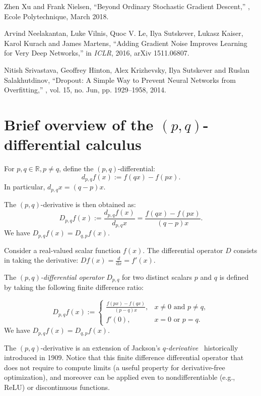 \documentclass{article}
\def\bbR{\mathbb{R}}
\def\dx{\mathrm{d}x}
\def\eqdef{:=}
\def\bbR{\mathbb{R}}
\begin{document}
\begin{thebibliography}{10}
Zhen Xu and Frank Nielsen,
\newblock ``Beyond Ordinary Stochastic Gradient Descent,''
, Ecole Polytechnique, March 2018.

Arvind Neelakantan, Luke Vilnis, Quoc V. Le, Ilya Sutskever, Lukasz Kaiser, Karol Kurach and James Martens,
\newblock ``Adding Gradient Noise Improves Learning for Very Deep Networks,''
\newblock in {\em ICLR}, 2016,
\newblock arXiv 1511.06807.

Nitish Srivastava, Geoffrey Hinton, Alex Krizhevsky, Ilya Sutskever and Ruslan Salakhutdinov,
\newblock ``Dropout: A Simple Way to Prevent Neural Networks from Overfitting,''
,
vol. 15, no. Jun, pp. 1929--1958, 2014.

\end{thebibliography}


\appendix

\section{Brief overview of the $(p,q)$-differential calculus}\label{sec:pqgradient}


For $p,q\in\bbR, p\not =q$, define the $(p,q)$-differential:
	$$
	d_{p,q} f(x) \eqdef f(qx)-f(px).
	$$
	In particular, $d_{p,q} x=(q-p)x$.
	
The $(p,q)$-derivative is then obtained as:
	$$
	D_{p,q} f(x) \eqdef \frac{d_{p,q} f(x)}{d_{p,q} x} =  \frac{f(qx)-f(px)}{(q-p)x}.
	$$
	We have $D_{p,q} f(x)=D_{q,p} f(x)$.


Consider a real-valued scalar function $f(x)$.
The differential operator $D$ consists in taking the derivative: $D f(x)=\frac{d}{\dx}=f'(x)$.

The {\em $(p,q)$-differential operator} $D_{p,q}$  for two distinct scalars $p$ and $q$ is defined by taking the following finite difference ratio:

\begin{equation}
D_{p,q} f(x) \eqdef
\left\{
\begin{array}{ll}
\frac{f(px)-f(qx)}{(p-q)x},& x\not =0\mbox{\ and\ } p\not= q,\\
f'(0),& x=0 \mbox{\ or\ } p=q.
\end{array}
\right.
\end{equation}
We have $D_{p,q} f(x)=D_{q,p} f(x)$.

The $(p,q)$-derivative  is an extension of Jackson's {\em $q$-derivative}~\cite{Jackson-1909,qbook-2001,qbook-2012,pq-2013} historically introduced in 1909.
Notice that this finite difference differential operator that does not require to compute limits (a useful property for derivative-free optimization), and moreover can be applied even to
nondifferentiable (e.g., ReLU) or discontinuous functions.
\end{document}
